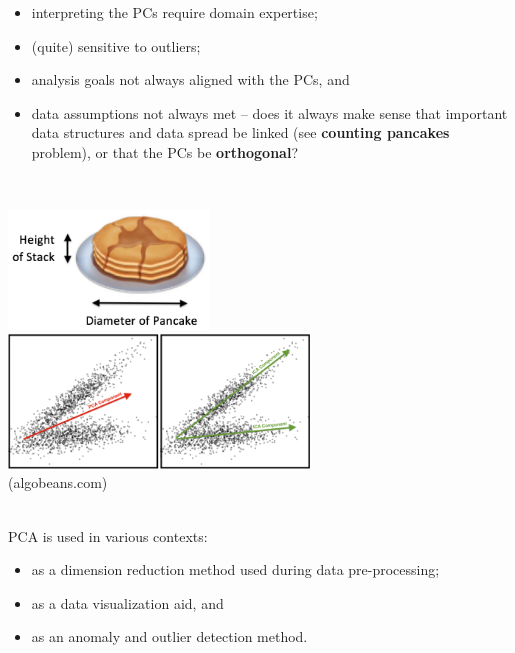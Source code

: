 \documentclass[20pt,landscape,footrule,headrule]{foils}
\newcommand{\newl}{\newline\newline}
\begin{document}
{{\begin{itemize}
\item interpreting the PCs require domain expertise;
\item (quite) sensitive to outliers;
\item analysis goals not always aligned with the PCs, and 
\item data assumptions not always met -- does it always make sense that important data structures and data spread be linked (see \textbf{counting pancakes} problem), or that the PCs be \textbf{orthogonal}?
\end{itemize} 
\newpage\ 
\begin{center}
\includegraphics[width=0.4\textwidth]{Images/pancake} \\ 
\includegraphics[width=0.6\textwidth]{Images/ICA} \\ (algobeans.com) 
\end{center}

\newpage\ \\ \noindent  PCA is used in various contexts:
\begin{itemize}
    \item as a dimension reduction method used during data pre-processing;
    \item as a data visualization aid, and
    \item as an anomaly and outlier detection method.
\end{itemize}

}}
\end{document}
